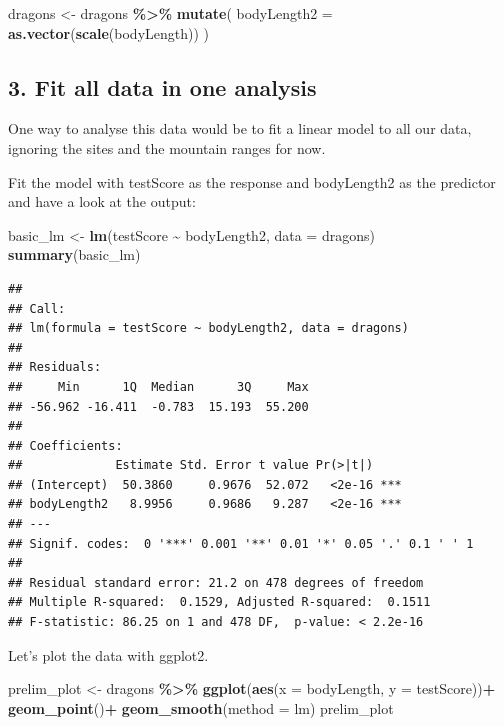\documentclass[
]{article}
\newenvironment{Shaded}{\begin{snugshade}}{\end{snugshade}}
\newcommand{\AttributeTok}[1]{\textcolor[rgb]{0.13,0.29,0.53}{#1}}
\newcommand{\FunctionTok}[1]{\textcolor[rgb]{0.13,0.29,0.53}{\textbf{#1}}}
\newcommand{\NormalTok}[1]{#1}
\newcommand{\OtherTok}[1]{\textcolor[rgb]{0.56,0.35,0.01}{#1}}
\newcommand{\SpecialCharTok}[1]{\textcolor[rgb]{0.81,0.36,0.00}{\textbf{#1}}}
\newcommand{\StringTok}[1]{\textcolor[rgb]{0.31,0.60,0.02}{#1}}
\begin{document}
\begin{Shaded}
\begin{Highlighting}[]
\NormalTok{dragons }\OtherTok{\textless{}{-}}\NormalTok{ dragons }\SpecialCharTok{\%\textgreater{}\%} 
  \FunctionTok{mutate}\NormalTok{(}
    \AttributeTok{bodyLength2 =} \FunctionTok{as.vector}\NormalTok{(}\FunctionTok{scale}\NormalTok{(bodyLength))}
\NormalTok{  )}
\end{Highlighting}
\end{Shaded}

\subsection{3. Fit all data in one
analysis}\label{fit-all-data-in-one-analysis}

One way to analyse this data would be to fit a linear model to all our
data, ignoring the sites and the mountain ranges for now.

Fit the model with testScore as the response and bodyLength2 as the
predictor and have a look at the output:

\begin{Shaded}
\begin{Highlighting}[]
\NormalTok{basic\_lm }\OtherTok{\textless{}{-}} \FunctionTok{lm}\NormalTok{(testScore }\SpecialCharTok{\textasciitilde{}}\NormalTok{ bodyLength2, }\AttributeTok{data =}\NormalTok{ dragons)}
\FunctionTok{summary}\NormalTok{(basic\_lm)}
\end{Highlighting}
\end{Shaded}

\begin{verbatim}
## 
## Call:
## lm(formula = testScore ~ bodyLength2, data = dragons)
## 
## Residuals:
##     Min      1Q  Median      3Q     Max 
## -56.962 -16.411  -0.783  15.193  55.200 
## 
## Coefficients:
##             Estimate Std. Error t value Pr(>|t|)    
## (Intercept)  50.3860     0.9676  52.072   <2e-16 ***
## bodyLength2   8.9956     0.9686   9.287   <2e-16 ***
## ---
## Signif. codes:  0 '***' 0.001 '**' 0.01 '*' 0.05 '.' 0.1 ' ' 1
## 
## Residual standard error: 21.2 on 478 degrees of freedom
## Multiple R-squared:  0.1529, Adjusted R-squared:  0.1511 
## F-statistic: 86.25 on 1 and 478 DF,  p-value: < 2.2e-16
\end{verbatim}

Let's plot the data with ggplot2.

\begin{Shaded}
\begin{Highlighting}[]
\NormalTok{prelim\_plot }\OtherTok{\textless{}{-}}\NormalTok{ dragons }\SpecialCharTok{\%\textgreater{}\%} 
  \FunctionTok{ggplot}\NormalTok{(}\FunctionTok{aes}\NormalTok{(}\AttributeTok{x =}\NormalTok{ bodyLength, }\AttributeTok{y =}\NormalTok{ testScore))}\SpecialCharTok{+}
  \FunctionTok{geom\_point}\NormalTok{()}\SpecialCharTok{+}
  \FunctionTok{geom\_smooth}\NormalTok{(}\AttributeTok{method =} \StringTok{\textquotesingle{}lm\textquotesingle{}}\NormalTok{)}
\NormalTok{prelim\_plot}
\end{Highlighting}
\end{Shaded}
\end{document}
